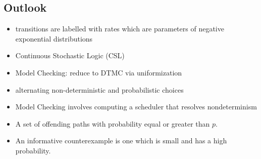 \documentclass[a4paper, 10pt]{article}
\begin{document}
\subsection{Outlook}
\begin{mdframed}[roundcorner=5pt,
subtitlebelowline=false,subtitleaboveline=false,
subtitlebackgroundcolor=blue!30,
frametitlerule=true,
frametitlebackgroundcolor=blue!30,
frametitle={Continuous Time Markov Chain (CTMC)}
]
\begin{itemize}
    \item transitions are labelled with rates which are parameters of negative exponential distributions
    \item Continuous Stochastic Logic (CSL)
    \item Model Checking: reduce to DTMC via uniformization
\end{itemize}
\begin{itemize}
    \item alternating non-deterministic and probabilistic choices
    \item Model Checking involves computing a scheduler that resolves nondeterminism
\end{itemize}
\begin{itemize}
    \item A set of offending paths with probability equal or greater than $p$.
    \item An informative counterexample is one which is small and has a high probability.
\end{itemize}
\end{mdframed}
\end{document}
